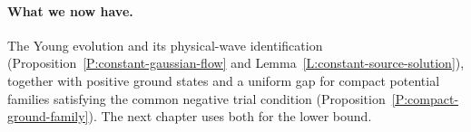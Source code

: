 \paragraph{What we now have.}
The Young evolution and its physical-wave identification
(Proposition~\ref{P:constant-gaussian-flow} and
Lemma~\ref{L:constant-source-solution}), together with positive ground states
and a uniform gap for compact potential families satisfying the common
negative trial condition (Proposition~\ref{P:compact-ground-family}). The next
chapter uses both for the lower bound.
